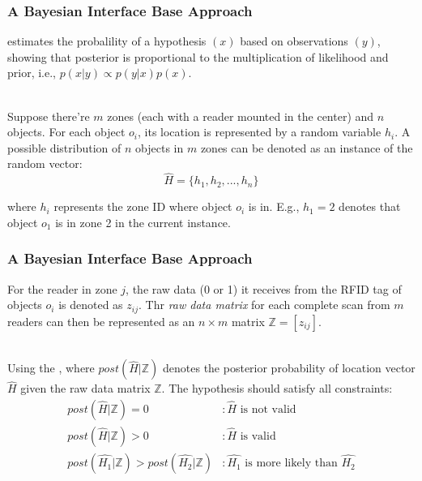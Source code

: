 
\begin{frame}
\frametitle{A Bayesian Interface Base Approach}

 estimates the probalility of a hypothesis $(x)$ based on observations $(y)$, showing that posterior is proportional to the multiplication of likelihood and prior, i.e., $p(x|y) \propto p(y|x)p(x)$.\\~\\\pause

Suppose there're $m$ zones (each with a reader mounted in the center) and $n$ objects. For each object $o_i$, its location is represented by a random variable $h_i$. A possible distribution of $n$ objects in $m$ zones can be denoted as an instance of the random vector:\pause
\begin{equation}
  \hat{H} = \{ h_1, h_2, ..., h_n \}
\end{equation}
\pause

where $h_i$ represents the zone ID where object $o_i$ is in. E.g., $h_1 = 2$ denotes that object $o_1$ is in zone 2 in the current instance.

\end{frame}


\begin{frame}
\frametitle{A Bayesian Interface Base Approach}

For the reader in zone $j$, the raw data (0 or 1) it receives from the RFID tag of objects $o_i$ is denoted as $z_{ij}$. Thr \emph{raw data matrix} for each complete scan from $m$ readers can then be represented as an $n \times m$ matrix $\mathbb{Z} = [z_{ij}]$. \\~\\ \pause

Using the , where $post(\hat{H}|\mathbb{Z})$ denotes the posterior probability of location vector $\hat{H}$ given the raw data matrix $\mathbb{Z}$. The hypothesis should satisfy all constraints: \pause
\begin{equation}
  \begin{split}
  post(\hat{H}|\mathbb{Z}) = 0 & :\hat{H} \textrm{ is not valid} \\
  post(\hat{H}|\mathbb{Z}) > 0 & :\hat{H} \textrm{ is valid} \\
  post(\hat{H_1}|\mathbb{Z}) > post(\hat{H_2}|\mathbb{Z}) & :\hat{H_1} \textrm{ is more likely than } \hat{H_2}
  \end{split}
\end{equation}

\end{frame}

